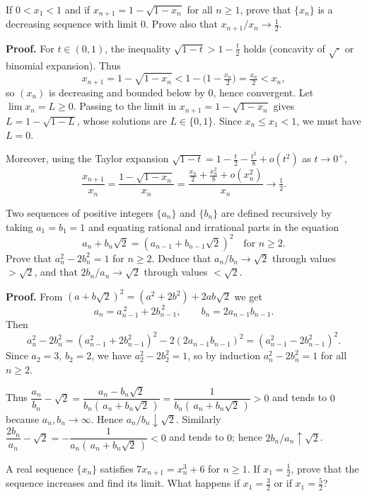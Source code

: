 \begin{problembox}
If $0 < x_1 < 1$ and if $x_{n+1} = 1 - \sqrt{1 - x_n}$ for all $n \geq 1$, prove that $\{x_n\}$ is a decreasing sequence with limit 0. Prove also that $x_{n+1}/x_n \to \frac{1}{2}$.
\end{problembox}

\noindent\textbf{Proof.}
For $t\in(0,1)$, the inequality $\sqrt{1-t}>1-\tfrac{t}{2}$ holds (concavity of $\sqrt{\cdot}$ or binomial expansion). Thus
\[
x_{n+1}=1-\sqrt{1-x_n}<1-\Big(1-\tfrac{x_n}{2}\Big)=\tfrac{x_n}{2}<x_n,
\]
so $(x_n)$ is decreasing and bounded below by $0$, hence convergent. Let $\lim x_n=L\ge 0$. Passing to the limit in $x_{n+1}=1-\sqrt{1-x_n}$ gives $L=1-\sqrt{1-L}$, whose solutions are $L\in\{0,1\}$. Since $x_n\le x_1<1$, we must have $L=0$.

Moreover, using the Taylor expansion $\sqrt{1-t}=1-\tfrac{t}{2}-\tfrac{t^2}{8}+o(t^2)$ as $t\to 0^+$,
\[
\frac{x_{n+1}}{x_n}=\frac{1-\sqrt{1-x_n}}{x_n}=\frac{\tfrac{x_n}{2}+\tfrac{x_n^2}{8}+o(x_n^2)}{x_n}\to \tfrac12.
\]
\medskip

\begin{problembox}
Two sequences of positive integers $\{a_n\}$ and $\{b_n\}$ are defined recursively by taking $a_1 = b_1 = 1$ and equating rational and irrational parts in the equation
\[a_n + b_n \sqrt{2} = (a_{n-1} + b_{n-1} \sqrt{2})^2 \quad \text{for } n \geq 2.\]
Prove that $a_n^2 - 2b_n^2 = 1$ for $n \geq 2$. Deduce that $a_n/b_n \to \sqrt{2}$ through values $> \sqrt{2}$, and that $2b_n/a_n \to \sqrt{2}$ through values $< \sqrt{2}$.
\end{problembox}

\noindent\textbf{Proof.}
From $(a+b\sqrt2)^2=(a^2+2b^2)+2ab\sqrt2$ we get
\[
a_n=a_{n-1}^{\,2}+2b_{n-1}^{\,2},\qquad b_n=2a_{n-1}b_{n-1}.
\]
Then
\[
a_n^2-2b_n^2=(a_{n-1}^2+2b_{n-1}^2)^2-2(2a_{n-1}b_{n-1})^2=(a_{n-1}^2-2b_{n-1}^2)^2.
\]
Since $a_2=3$, $b_2=2$, we have $a_2^2-2b_2^2=1$, so by induction $a_n^2-2b_n^2=1$ for all $n\ge 2$.

Thus $\dfrac{a_n}{b_n}-\sqrt2=\dfrac{a_n-b_n\sqrt2}{b_n(\,a_n+b_n\sqrt2\,)}=\dfrac{1}{b_n(\,a_n+b_n\sqrt2\,)}>0$ and tends to $0$ because $a_n,b_n\to\infty$. Hence $a_n/b_n\downarrow\sqrt2$. Similarly $\dfrac{2b_n}{a_n}-\sqrt2=-\dfrac{1}{a_n(\,a_n+b_n\sqrt2\,)}<0$ and tends to $0$; hence $2b_n/a_n\uparrow\sqrt2$.
\medskip

\begin{problembox}
A real sequence $\{x_n\}$ satisfies $7x_{n+1} = x_n^3 + 6$ for $n \geq 1$. If $x_1 = \frac{1}{2}$, prove that the sequence increases and find its limit. What happens if $x_1 = \frac{3}{2}$ or if $x_1 = \frac{5}{2}$?
\end{problembox}

